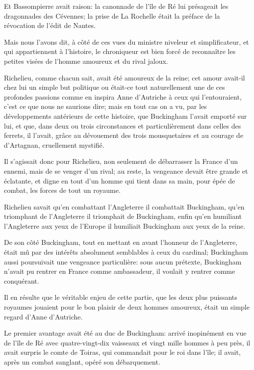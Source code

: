 Et Bassompierre avait raison: la canonnade de l'île de Ré lui présageait les dragonnades des Cévennes; la prise de La Rochelle était la préface de la révocation de l'édit de Nantes. 

Mais nous l'avons dit, à côté de ces vues du ministre niveleur et simplificateur, et qui appartiennent à l'histoire, le chroniqueur est bien forcé de reconnaître les petites visées de l'homme amoureux et du rival jaloux. 

Richelieu, comme chacun sait, avait été amoureux de la reine; cet amour avait-il chez lui un simple but politique ou était-ce tout naturellement une de ces profondes passions comme en inspira Anne d'Autriche à ceux qui l'entouraient, c'est ce que nous ne saurions dire; mais en tout cas on a vu, par les développements antérieurs de cette histoire, que Buckingham l'avait emporté sur lui, et que, dans deux ou trois circonstances et particulièrement dans celles des ferrets, il l'avait, grâce au dévouement des trois mousquetaires et au courage de d'Artagnan, cruellement mystifié. 

Il s'agissait donc pour Richelieu, non seulement de débarrasser la France d'un ennemi, mais de se venger d'un rival; au reste, la vengeance devait être grande et éclatante, et digne en tout d'un homme qui tient dans sa main, pour épée de combat, les forces de tout un royaume. 

Richelieu savait qu'en combattant l'Angleterre il combattait Buckingham, qu'en triomphant de l'Angleterre il triomphait de Buckingham, enfin qu'en humiliant l'Angleterre aux yeux de l'Europe il humiliait Buckingham aux yeux de la reine. 

De son côté Buckingham, tout en mettant en avant l'honneur de l'Angleterre, était mû par des intérêts absolument semblables à ceux du cardinal; Buckingham aussi poursuivait une vengeance particulière: sous aucun prétexte, Buckingham n'avait pu rentrer en France comme ambassadeur, il voulait y rentrer comme conquérant. 

Il en résulte que le véritable enjeu de cette partie, que les deux plus puissants royaumes jouaient pour le bon plaisir de deux hommes amoureux, était un simple regard d'Anne d'Autriche. 

Le premier avantage avait été au duc de Buckingham: arrivé inopinément en vue de l'île de Ré avec quatre-vingt-dix vaisseaux et vingt mille hommes à peu près, il avait surpris le comte de Toiras, qui commandait pour le roi dans l'île; il avait, après un combat sanglant, opéré son débarquement. 

